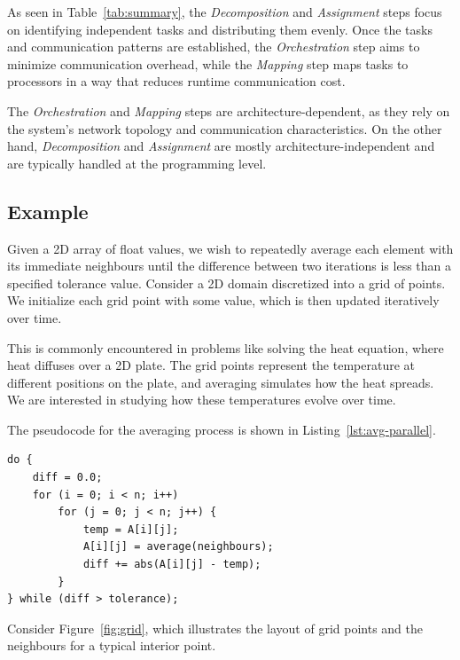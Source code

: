 \documentclass[12pt]{book}
\begin{document}
As seen in Table~\ref{tab:summary}, the \textit{Decomposition} and \textit{Assignment} steps focus on identifying independent tasks and distributing them evenly. Once the tasks and communication patterns are established, the \textit{Orchestration} step aims to minimize communication overhead, while the \textit{Mapping} step maps tasks to processors in a way that reduces runtime communication cost.

The \textit{Orchestration} and \textit{Mapping} steps are architecture-dependent, as they rely on the system's network topology and communication characteristics. On the other hand, \textit{Decomposition} and \textit{Assignment} are mostly architecture-independent and are typically handled at the programming level.



\subsection{Example}

Given a 2D array of float values, we wish to repeatedly average each element with its immediate neighbours until the difference between two iterations is less than a specified tolerance value. Consider a 2D domain discretized into a grid of points. We initialize each grid point with some value, which is then updated iteratively over time.

This is commonly encountered in problems like solving the heat equation, where heat diffuses over a 2D plate. The grid points represent the temperature at different positions on the plate, and averaging simulates how the heat spreads. We are interested in studying how these temperatures evolve over time.

The pseudocode for the averaging process is shown in Listing~\ref{lst:avg-parallel}.

\begin{lstlisting}[style=cppstyle,caption={Parallel Program for Averaging},label={lst:avg-parallel},captionpos=b]
do {
    diff = 0.0;
    for (i = 0; i < n; i++)
        for (j = 0; j < n; j++) {
            temp = A[i][j];
            A[i][j] = average(neighbours);
            diff += abs(A[i][j] - temp);
        }
} while (diff > tolerance);
\end{lstlisting}

Consider Figure~\ref{fig:grid}, which illustrates the layout of grid points and the neighbours for a typical interior point.
\end{document}
